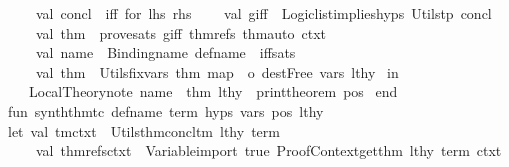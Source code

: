 \begin{isabellebody}
\ \ \ \ val\ concl\ {\isacharequal}{\kern0pt}\ \isactrlConst {\isasymopen}iff\ for\ lhs\ rhs{\isasymclose}\isanewline
\ \ \ \ val\ g{\isacharunderscore}{\kern0pt}iff\ {\isacharequal}{\kern0pt}\ Logic{\isachardot}{\kern0pt}list{\isacharunderscore}{\kern0pt}implies{\isacharparenleft}{\kern0pt}hyps{\isacharcomma}{\kern0pt}\ Utils{\isachardot}{\kern0pt}tp\ concl{\isacharparenright}{\kern0pt}\isanewline
\ \ \ \ val\ thm\ {\isacharequal}{\kern0pt}\ prove{\isacharunderscore}{\kern0pt}sats\ g{\isacharunderscore}{\kern0pt}iff\ thm{\isacharunderscore}{\kern0pt}refs\ thm{\isacharunderscore}{\kern0pt}auto\ ctxt{}\isanewline
\ \ \ \ val\ name\ {\isacharequal}{\kern0pt}\ Binding{\isachardot}{\kern0pt}name\ {\isacharparenleft}{\kern0pt}def{\isacharunderscore}{\kern0pt}name\ {\isacharcircum}{\kern0pt}\ {\isachardoublequote}{\kern0pt}{\isacharunderscore}{\kern0pt}iff{\isacharunderscore}{\kern0pt}sats{\isachardoublequote}{\kern0pt}{\isacharparenright}{\kern0pt}\isanewline
\ \ \ \ val\ thm\ {\isacharequal}{\kern0pt}\ Utils{\isachardot}{\kern0pt}fix{\isacharunderscore}{\kern0pt}vars\ thm\ {\isacharparenleft}{\kern0pt}map\ {\isacharparenleft}{\kern0pt}{\isacharhash}{\kern0pt}{}\ o\ dest{\isacharunderscore}{\kern0pt}Free{\isacharparenright}{\kern0pt}\ vars{\isacharprime}{\kern0pt}{\isacharparenright}{\kern0pt}\ lthy\isanewline
\ in\isanewline
\ \ \ Local{\isacharunderscore}{\kern0pt}Theory{\isachardot}{\kern0pt}note\ {\isacharparenleft}{\kern0pt}{\isacharparenleft}{\kern0pt}name{\isacharcomma}{\kern0pt}\ {\isacharbrackleft}{\kern0pt}{\isacharbrackright}{\kern0pt}{\isacharparenright}{\kern0pt}{\isacharcomma}{\kern0pt}\ {\isacharbrackleft}{\kern0pt}thm{\isacharbrackright}{\kern0pt}{\isacharparenright}{\kern0pt}\ lthy\ {\isacharbar}{\kern0pt}{\isachargreater}{\kern0pt}\ print{\isacharunderscore}{\kern0pt}theorem\ pos\isanewline
\ end\isanewline
\isanewline
fun\ synth{\isacharunderscore}{\kern0pt}thm{\isacharunderscore}{\kern0pt}tc\ def{\isacharunderscore}{\kern0pt}name\ term\ hyps\ vars\ pos\ lthy\ {\isacharequal}{\kern0pt}\isanewline
let\ val\ {\isacharparenleft}{\kern0pt}{\isacharunderscore}{\kern0pt}{\isacharcomma}{\kern0pt}tm{\isacharcomma}{\kern0pt}ctxt{}{\isacharparenright}{\kern0pt}\ {\isacharequal}{\kern0pt}\ Utils{\isachardot}{\kern0pt}thm{\isacharunderscore}{\kern0pt}concl{\isacharunderscore}{\kern0pt}tm\ lthy\ term\isanewline
\ \ \ \ val\ {\isacharparenleft}{\kern0pt}thm{\isacharunderscore}{\kern0pt}refs{\isacharcomma}{\kern0pt}ctxt{}{\isacharparenright}{\kern0pt}\ {\isacharequal}{\kern0pt}\ Variable{\isachardot}{\kern0pt}import\ true\ {\isacharbrackleft}{\kern0pt}Proof{\isacharunderscore}{\kern0pt}Context{\isachardot}{\kern0pt}get{\isacharunderscore}{\kern0pt}thm\ lthy\ term{\isacharbrackright}{\kern0pt}\ ctxt{}\isanewline

\end{isabellebody}
